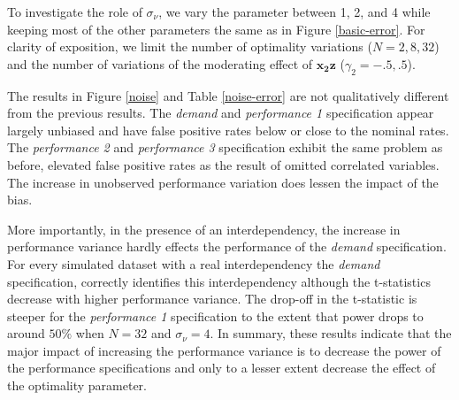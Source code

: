 \documentclass[12pt]{article}
\begin{document}
To investigate the role of \(\sigma_{\nu}\), we vary the parameter
between 1, 2, and 4 while keeping most of the other parameters the same
as in Figure \ref{basic-error}. For clarity of exposition, we limit the
number of optimality variations (\(N = 2, 8, 32\)) and the number of
variations of the moderating effect of \(\mathbf{x_2 z}\)
(\(\gamma_2 = -.5, .5\)).

The results in Figure \ref{noise} and Table \ref{noise-error} are not
qualitatively different from the previous results. The \emph{demand} and
\emph{performance 1} specification appear largely unbiased and have
false positive rates below or close to the nominal rates. The
\emph{performance 2} and \emph{performance 3} specification exhibit the
same problem as before, elevated false positive rates as the result of
omitted correlated variables. The increase in unobserved performance
variation does lessen the impact of the bias.

More importantly, in the presence of an interdependency, the increase in
performance variance hardly effects the performance of the \emph{demand}
specification. For every simulated dataset with a real interdependency
the \emph{demand} specification, correctly identifies this
interdependency although the t-statistics decrease with higher
performance variance. The drop-off in the t-statistic is steeper for the
\emph{performance 1} specification to the extent that power drops to
around \(50\%\) when \(N = 32\) and \(\sigma_{\nu} = 4\). In summary,
these results indicate that the major impact of increasing the
performance variance is to decrease the power of the performance
specifications and only to a lesser extent decrease the effect of the
optimality parameter.
\end{document}

